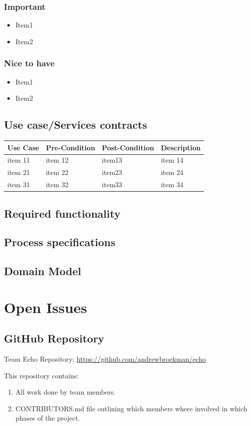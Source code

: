 \documentclass[a4paper,10pt]{article}
\begin{document}
\subsubsection{Important}
\begin{itemize}
\item Item1
\item Item2
\end{itemize}

\subsubsection{Nice to have}
\begin{itemize}
\item Item1
\item Item2
\end{itemize}

\subsection{Use case/Services contracts}
\begin{tabu} to \textwidth { | X[l] | X[l] | X[l] | X[l] | }
	\hline
		Use Case		& Pre-Condition		& Post-Condition		& Description	\\ \hline \hline
		item 11		& item 12			& item13				& item 14  \\ \hline
		item 21		& item 22			& item23				& item 24  \\ \hline
		item 31		& item 32			& item33				& item 34  \\
	\hline
\end{tabu}

\subsection{Required functionality}

\subsection{Process specifications}

\subsection{Domain Model}

\section{Open Issues}
\subsection {GitHub Repository}
Team Echo Repository: \url{https://github.com/andrewbroekman/echo}

This repository contains:
\begin{enumerate}
\item All work done by team members.
\item CONTRIBUTORS.md file outlining which members where involved in which phases of the project.
\end{enumerate}
\end{document}
